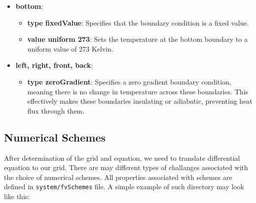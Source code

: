\documentclass{article}
\begin{document}
\begin{itemize}
\begin{itemize}
        \item \textbf{bottom}:
        \begin{itemize}
            \item \textbf{type fixedValue}: Specifies that the boundary condition is a fixed value.
            \item \textbf{value uniform 273}: Sets the temperature at the bottom boundary to a uniform value of 273 Kelvin.
        \end{itemize}

        \item \textbf{left, right, front, back}:
        \begin{itemize}
            \item \textbf{type zeroGradient}: Specifies a zero gradient boundary condition, 
                meaning there is no change in temperature across these boundaries. This effectively makes these boundaries insulating or adiabatic, preventing heat flux through them.
        \end{itemize}
    \end{itemize}
\end{itemize}

\subsection{Numerical Schemes}
After determination of the grid and equation, we need to translate differential equation to our grid. There are may different types of 
challanges associated with the choice of numerical schemes. All properties associated with schemes are defined in \texttt{system/fvSchemes} file.
A simple example of such directory may look like this:
\end{document}
